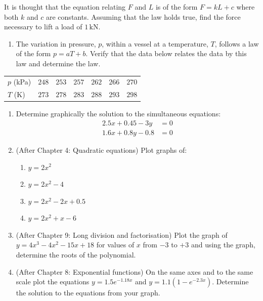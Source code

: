 \documentclass[
  12pt,
  oneside]{book}
\providecommand{\tightlist}{%
  \setlength{\itemsep}{0pt}\setlength{\parskip}{0pt}}
\theoremstyle{definition}
\theoremstyle{definition}
\theoremstyle{definition}
\theoremstyle{definition}
\theoremstyle{remark}
\begin{document}
It is thought that the equation relating \(F\) and \(L\) is of the form \(F = kL + c\) where both \(k\) and \(c\) are constants. Assuming that the law holds true, find the force necessary to lift a load of \(1\,\mathrm{kN}\).

\begin{enumerate}
\def\labelenumi{\arabic{enumi}.}
\setcounter{enumi}{2}
\tightlist
\item
  The variation in pressure, \(p\), within a vessel at a temperature, \(T\), follows a law of the form \(p = aT + b\). Verify that the data below relates the data by this law and determine the law.
\end{enumerate}

\begin{longtable}[]{@{}
  >{\raggedright\arraybackslash}p{}
  >{\raggedright\arraybackslash}p{}
  >{\raggedright\arraybackslash}p{}
  >{\raggedright\arraybackslash}p{}
  >{\raggedright\arraybackslash}p{}
  >{\raggedright\arraybackslash}p{}
  >{\raggedright\arraybackslash}p{}@{}}
\toprule\noalign{}
\endhead
\bottomrule\noalign{}
\endlastfoot
\(p\) (kPa) & \(248\) & \(253\) & \(257\) & \(262\) & \(266\) & \(270\) \\
\(T\) (K) & \(273\) & \(278\) & \(283\) & \(288\) & \(293\) & \(298\) \\
\end{longtable}

\begin{enumerate}
\def\labelenumi{\arabic{enumi}.}
\setcounter{enumi}{3}
\item
  Determine graphically the solution to the simultaneous equations:
  \begin{align*}
  2.5x + 0.45 - 3y &= 0\\
  1.6x + 0.8y - 0.8 &= 0
  \end{align*}
\item
  (After Chapter 4: Quadratic equations) Plot graphs of:

  \begin{enumerate}
  \def\labelenumii{\roman{enumii})}
  \tightlist
  \item
    \(y = 2x^2\)
  \item
    \(y = 2x^2 - 4\)
  \item
    \(y = 2x^2 - 2x + 0.5\)
  \item
    \(y = 2x^2 + x - 6\)
  \end{enumerate}
\item
  (After Chapter 9: Long division and factorisation) Plot the graph of \(y = 4x^3 - 4x^2 - 15x + 18\) for values of \(x\) from \(-3\) to \(+3\) and using the graph, determine the roots of the polynomial.
\item
  (After Chapter 8: Exponential functions) On the same axes and to the same scale plot the equations \(y = 1.5e^{-1.18x}\) and \(y = 1.1(1 - e^{-2.3x})\). Determine the solution to the equations from your graph.
\end{enumerate}
\end{document}
